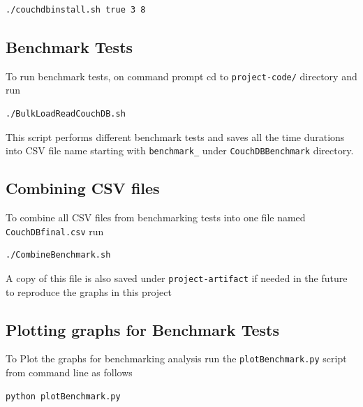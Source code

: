 \begin{verbatim} 
./couchdbinstall.sh true 3 8 
\end{verbatim}

\subsection{Benchmark Tests}
To run benchmark tests, on command prompt cd to \verb|project-code/| directory and run
\begin{verbatim}
./BulkLoadReadCouchDB.sh
\end{verbatim}
This script performs different benchmark tests and saves all the time
durations into CSV file name starting with \verb|benchmark_| under
\verb|CouchDBBenchmark| directory.

\subsection{Combining CSV files}
To combine all CSV files from benchmarking tests into one file named \verb|CouchDBfinal.csv| run
\begin{verbatim}
./CombineBenchmark.sh 
\end{verbatim}


A copy of this file is also saved under \verb|project-artifact| if needed in
the future to reproduce the graphs in this project

\subsection{Plotting graphs for Benchmark Tests}
To Plot the graphs for benchmarking analysis run the 
\verb|plotBenchmark.py| script from command line as follows
\begin{verbatim}
python plotBenchmark.py
\end{verbatim}












